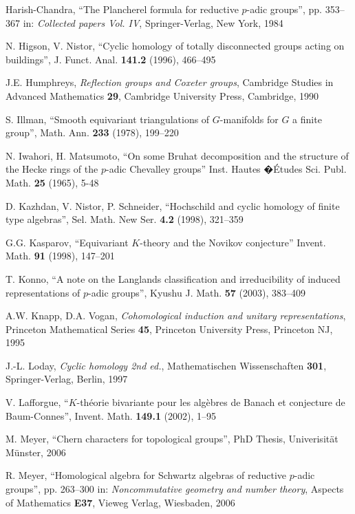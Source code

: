 \documentclass[11pt]{report}
\begin{document}
\begin{thebibliography}{99}
 Harish-Chandra,
``The Plancherel formula for reductive $p$-adic groups'',
pp. 353--367 in: \emph{Collected papers Vol. IV},
Springer-Verlag, New York, 1984

 N. Higson, V. Nistor,
``Cyclic homology of totally disconnected groups acting on buildings'',
J. Funct. Anal. \textbf{141.2} (1996), 466--495

 J.E. Humphreys,
\emph{Reflection groups and Coxeter groups}, Cambridge Studies in
Advanced Mathematics \textbf{29}, Cambridge University Press,
Cambridge, 1990

 S. Illman,
``Smooth equivariant triangulations of $G$-manifolds for $G$ a finite group'',
Math. Ann. \textbf{233} (1978), 199--220

 N. Iwahori, H. Matsumoto,
``On some Bruhat decomposition and the structure
of the Hecke rings of the $p$-adic Chevalley groups''
Inst. Hautes �\'Etudes Sci. Publ. Math. \textbf{25} (1965), 5-48

 D. Kazhdan, V. Nistor, P. Schneider,
``Hochschild and cyclic homology of finite type algebras'', Sel.
Math. New Ser. \textbf{4.2} (1998), 321--359

 G.G. Kasparov,
``Equivariant $K$-theory and the Novikov conjecture''
Invent. Math. \textbf{91} (1998), 147--201

 T. Konno,
``A note on the Langlands classification and irreducibility
of induced representations of $p$-adic groups'',
Kyushu J. Math. \textbf{57} (2003), 383--409

 A.W. Knapp, D.A. Vogan,
\emph{Cohomological induction and unitary representations},
Princeton Mathematical Series \textbf{45},
Princeton University Press, Princeton NJ, 1995

 J.-L. Loday,
\emph{Cyclic homology 2nd ed.},
Mathematischen Wissenschaften \textbf{301},
Springer-Verlag, Berlin, 1997

 V. Lafforgue,
``$K$-th\'eorie bivariante pour les alg\`ebres de Banach
et conjecture de Baum-Connes'',
Invent. Math. \textbf{149.1} (2002), 1--95

 M. Meyer,
``Chern characters for topological groups'',
PhD Thesis, Univerisit\"at M\"unster, 2006

 R. Meyer,
``Homological algebra for Schwartz algebras of reductive $p$-adic
groups'', pp. 263--300 in: \emph{Noncommutative geometry and number
theory}, Aspects of Mathematics \textbf{E37}, Vieweg Verlag,
Wiesbaden, 2006


\end{thebibliography}
\end{document}
